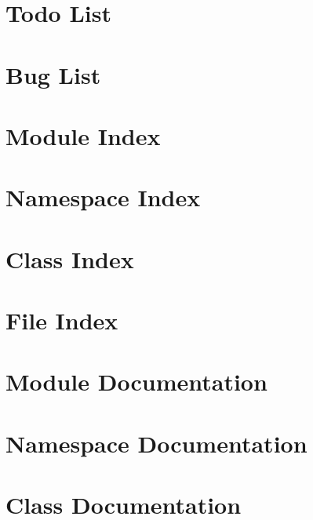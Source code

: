 \documentclass[twoside]{book}
\begin{document}
\chapter{Todo List}
\label{todo}
\hypertarget{todo}{}

\chapter{Bug List}
\label{bug}
\hypertarget{bug}{}

\chapter{Module Index}

\chapter{Namespace Index}

\chapter{Class Index}

\chapter{File Index}

\chapter{Module Documentation}







\chapter{Namespace Documentation}

\chapter{Class Documentation}











\end{document}
